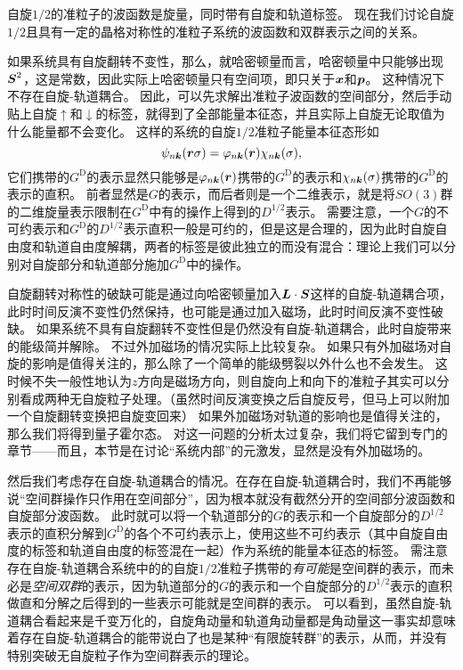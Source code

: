 自旋$1/2$的准粒子的波函数是旋量，同时带有自旋和轨道标签。
现在我们讨论自旋$1/2$且具有一定的晶格对称性的准粒子系统的波函数和双群表示之间的关系。

如果系统具有自旋翻转不变性，那么，就哈密顿量而言，哈密顿量中只能够出现$\vb*{S}^2$，这是常数，因此实际上哈密顿量只有空间项，即只关于$\vb*{x}$和$\vb*{p}$。
这种情况下不存在自旋-轨道耦合。
因此，可以先求解出准粒子波函数的空间部分，然后手动贴上自旋$\uparrow$和$\downarrow$的标签，就得到了全部能量本征态，并且实际上自旋无论取值为什么能量都不会变化。
这样的系统的自旋$1/2$准粒子能量本征态形如
\begin{equation}
    \psi_{n \vb*{k}}(\vb*{r} \sigma) = \varphi_{n \vb*{k}}(\vb*{r}) \chi_{n \vb*{k}}(\sigma),
\end{equation}
它们携带的$G^\text{D}$的表示显然只能够是$\varphi_{n \vb*{k}}(\vb*{r})$携带的$G^\text{D}$的表示和$\chi_{n \vb*{k}}(\sigma)$携带的$G^\text{D}$的表示的直积。
前者显然是$G$的表示，而后者则是一个二维表示，就是将$SO(3)$群的二维旋量表示限制在$G^\text{D}$中有的操作上得到的$D^{1/2}$表示。
需要注意，一个$G$的不可约表示和$G^\text{D}$的$D^{1/2}$表示直积一般是可约的，但是这是合理的，因为此时自旋自由度和轨道自由度解耦，两者的标签是彼此独立的而没有混合：理论上我们可以分别对自旋部分和轨道部分施加$G^\text{D}$中的操作。

自旋翻转对称性的破缺可能是通过向哈密顿量加入$\vb*{L} \cdot \vb*{S}$这样的自旋-轨道耦合项，此时时间反演不变性仍然保持，也可能是通过加入磁场，此时时间反演不变性破缺。
如果系统不具有自旋翻转不变性但是仍然没有自旋-轨道耦合，此时自旋带来的能级简并解除。
不过外加磁场的情况实际上比较复杂。
如果只有外加磁场对自旋的影响是值得关注的，那么除了一个简单的能级劈裂以外什么也不会发生。
这时候不失一般性地认为$z$方向是磁场方向，则自旋向上和向下的准粒子其实可以分别看成两种无自旋粒子处理。（虽然时间反演变换之后自旋反号，但马上可以附加一个自旋翻转变换把自旋变回来）
如果外加磁场对轨道的影响也是值得关注的，那么我们将得到量子霍尔态。
对这一问题的分析太过复杂，我们将它留到专门的章节——而且，本节是在讨论“系统内部”的元激发，显然是没有外加磁场的。

然后我们考虑存在自旋-轨道耦合的情况。在存在自旋-轨道耦合时，我们不再能够说“空间群操作只作用在空间部分”，因为根本就没有截然分开的空间部分波函数和自旋部分波函数。
此时就可以将一个轨道部分的$G$的表示和一个自旋部分的$D^{1/2}$表示的直积分解到$G^\text{D}$的各个不可约表示上，使用这些不可约表示（其中自旋自由度的标签和轨道自由度的标签混在一起）作为系统的能量本征态的标签。
需注意存在自旋-轨道耦合系统中的的自旋$1/2$准粒子携带的\emph{有可能}是空间群的表示，而未必是\emph{空间双群}的表示，因为轨道部分的$G$的表示和一个自旋部分的$D^{1/2}$表示的直积做直和分解之后得到的一些表示可能就是空间群的表示。
可以看到，虽然自旋-轨道耦合看起来是千变万化的，自旋角动量和轨道角动量都是角动量这一事实却意味着存在自旋-轨道耦合的能带说白了也是某种“有限旋转群”的表示，从而，并没有特别突破无自旋粒子作为空间群表示的理论。

